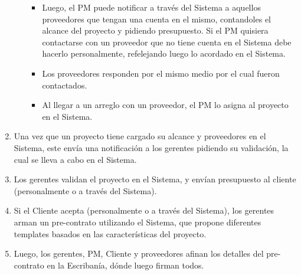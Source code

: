 \begin{enumerate}
\begin{itemize}
\begin{itemize}
                    \item Luego, el PM puede notificar a través del Sistema a aquellos proveedores que tengan una cuenta en el mismo, contandoles el alcance del proyecto y pidiendo
                        presupuesto. Si el PM quisiera contactarse con un proveedor que no tiene cuenta en el Sistema debe hacerlo personalmente, refelejando luego lo acordado en el Sistema.
                    \item Los proveedores responden por el mismo medio por el cual fueron contactados.
                    \item Al llegar a un arreglo con un proveedor, el PM lo asigna al proyecto en el Sistema.
                \end{itemize}
        \end{itemize}
    \item Una vez que un proyecto tiene cargado su alcance y proveedores en el Sistema, este envía una notificación a los gerentes pidiendo su validación, la cual se lleva a cabo en el Sistema.
    \item Los gerentes validan el proyecto en el Sistema, y envían presupuesto al cliente (personalmente o a través del Sistema).
    \item Si el Cliente acepta (personalmente o a través del Sistema), los gerentes arman un pre-contrato utilizando el Sistema, que propone diferentes templates basados en las características del proyecto.
    \item Luego, los gerentes, PM, Cliente y proveedores afinan los detalles del pre-contrato en la Escribanía, dónde luego firman todos.
\end{enumerate}

